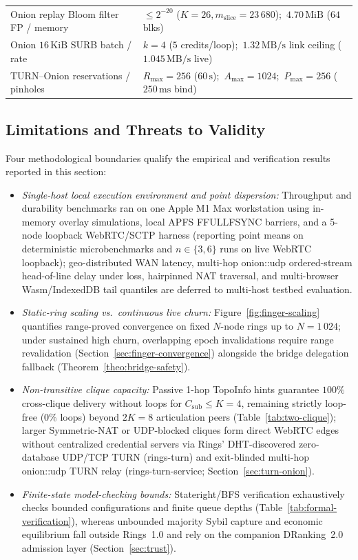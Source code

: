 \documentclass[journal]{IEEEtran}
\DeclareRobustCommand{\code}[1]{{\ttfamily\renewcommand{\_}{\textunderscore\allowbreak}#1}}
\begin{document}
\begin{table}[htbp]
\begin{tabular}{@{}>{\raggedright\arraybackslash}p{}>{\raggedright\arraybackslash}p{}@{}}
Onion replay Bloom filter FP / memory & $\le 2^{-20}$ ($K=26, m_{\mathrm{slice}}=23\,680$);\ $4.70\,\text{MiB}$ ($64$ blks) \\
Onion $16\,\text{KiB}$ SURB batch / rate & $k=4$ ($5$ credits/loop);\ $1.32\,\text{MB/s}$ link ceiling ($1.045\,\text{MB/s}$ live) \\
TURN--Onion reservations / pinholes & $R_{\max}=256$ ($60\,\text{s}$);\ $A_{\max}=1024$;\ $P_{\max}=256$ ($250\,\text{ms}$ bind) \\
\bottomrule
\end{tabular}
\end{table}

\subsection{Limitations and Threats to Validity}

Four methodological boundaries qualify the empirical and verification results reported in this section:
\begin{itemize}[leftmargin=1.5em]
\item \emph{Single-host local execution environment and point dispersion:} Throughput and durability benchmarks ran on one Apple M1 Max workstation using in-memory overlay simulations, local APFS \code{F\_FULLFSYNC} barriers, and a 5-node loopback WebRTC/SCTP harness (reporting point means on deterministic microbenchmarks and $n\in\{3,6\}$ runs on live WebRTC loopback); geo-distributed WAN latency, multi-hop \code{onion::udp} ordered-stream head-of-line delay under loss, hairpinned NAT traversal, and multi-browser Wasm/IndexedDB tail quantiles are deferred to multi-host testbed evaluation.
\item \emph{Static-ring scaling vs.\ continuous live churn:} Figure~\ref{fig:finger-scaling} quantifies range-proved convergence on fixed $N$-node rings up to $N=1\,024$; under sustained high churn, overlapping epoch invalidations require range revalidation (Section~\ref{sec:finger-convergence}) alongside the bridge delegation fallback (Theorem~\ref{theo:bridge-safety}).
\item \emph{Non-transitive clique capacity:} Passive 1-hop \code{TopoInfo} hints guarantee $100\%$ cross-clique delivery without loops for $C_{\mathrm{sub}}\le K=4$, remaining strictly loop-free ($0\%$ loops) beyond $2K=8$ articulation peers (Table~\ref{tab:two-clique}); larger Symmetric-NAT or UDP-blocked cliques form direct WebRTC edges without centralized credential servers via Rings' DHT-discovered zero-database UDP/TCP TURN (\code{rings-turn}) and exit-blinded multi-hop \code{onion::udp} TURN relay (\code{rings-turn-service}; Section~\ref{sec:turn-onion}).
\item \emph{Finite-state model-checking bounds:} Stateright/BFS verification exhaustively checks bounded configurations and finite queue depths (Table~\ref{tab:formal-verification}), whereas unbounded majority Sybil capture and economic equilibrium fall outside Rings~1.0 and rely on the companion DRanking~2.0 admission layer (Section~\ref{sec:trust}).
\end{itemize}
\end{document}
